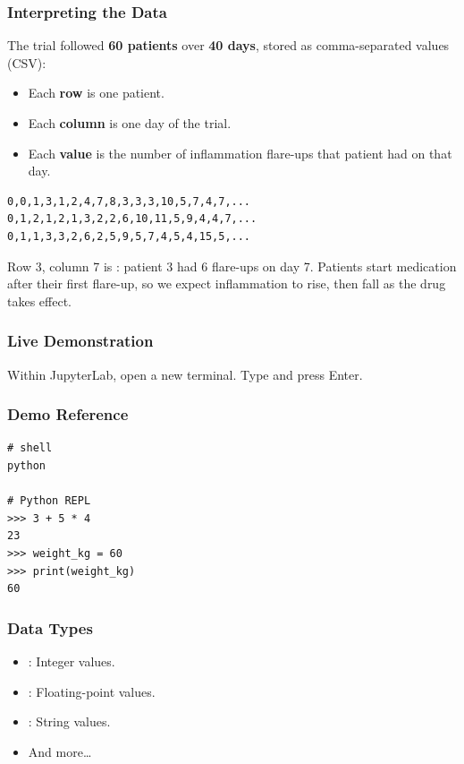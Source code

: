 \documentclass{beamer}
\begin{document}
\begin{frame}[fragile]
    \frametitle{Interpreting the Data}
    The trial followed \textbf{60 patients} over \textbf{40 days}, stored as
    comma-separated values (CSV):
    \begin{itemize}
        \item Each \textbf{row} is one patient.
        \item Each \textbf{column} is one day of the trial.
        \item Each \textbf{value} is the number of inflammation flare-ups
              that patient had on that day.
    \end{itemize}

    \begin{lstlisting}[style=demo]
0,0,1,3,1,2,4,7,8,3,3,3,10,5,7,4,7,...
0,1,2,1,2,1,3,2,2,6,10,11,5,9,4,4,7,...
0,1,1,3,3,2,6,2,5,9,5,7,4,5,4,15,5,...
    \end{lstlisting}

    Row 3, column 7 is : patient 3 had 6 flare-ups on day 7.
    Patients start medication after their first flare-up, so we expect
    inflammation to rise, then fall as the drug takes effect.
\end{frame}

\begin{frame}[fragile]
    \frametitle{Live Demonstration}
    Within JupyterLab, open a new terminal. Type  and press Enter.


\end{frame}

\begin{frame}[fragile]
    \frametitle{Demo Reference}
    \begin{lstlisting}[style=demo]
# shell
python

# Python REPL
>>> 3 + 5 * 4
23
>>> weight_kg = 60
>>> print(weight_kg)
60
    \end{lstlisting}
\end{frame}

\begin{frame}[fragile]
    \frametitle{Data Types}
    \begin{itemize}
        \item {}: Integer values.
        \item {}: Floating-point values.
        \item {}: String values.
        \item And more\ldots
    \end{itemize}
\end{frame}
\end{document}
